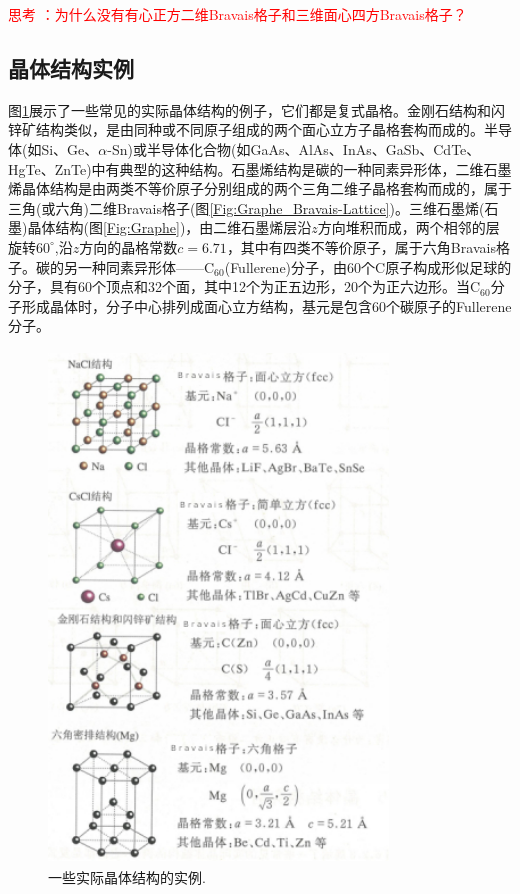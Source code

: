 \textcolor{red}{\heiti 思考 ：为什么没有有心正方二维Bravais格子和三维面心四方Bravais格子？}

\subsection{晶体结构实例}
图\ref{Fig:Crystal-structure-example}展示了一些常见的实际晶体结构的例子，它们都是复式晶格。金刚石结构和闪锌矿结构类似，是由同种或不同原子组成的两个面心立方子晶格套构而成的。半导体(如Si、Ge、$\alpha$-Sn)或半导体化合物(如GaAs、AlAs、InAs、GaSb、CdTe、HgTe、ZnTe)中有典型的这种结构。石墨烯结构是碳的一种同素异形体，二维石墨烯晶体结构是由两类不等价原子分别组成的两个三角二维子晶格套构而成的，属于三角(或六角)二维Bravais格子(图\ref{Fig:Graphe_Bravais-Lattice})。三维石墨烯(石墨)晶体结构(图\ref{Fig:Graphe})，由二维石墨烯层沿$z$方向堆积而成，两个相邻的层旋转$60^{\circ}$,沿$z$方向的晶格常数$c=6.71$，其中有四类不等价原子，属于六角Bravais格子。碳的另一种同素异形体——$\mathrm{C}_{60}$(Fullerene)分子，由60个C原子构成形似足球的分子，具有60个顶点和32个面，其中12个为正五边形，20个为正六边形。当$\mathrm{C}_{60}$分子形成晶体时，分子中心排列成面心立方结构，基元是包含60个碳原子的Fullerene分子。
\begin{figure}[h!]
\centering
\vspace*{-0.05in}
\includegraphics[height=5.35in,width=3.55in,viewport=0 0 70 110,clip]{Figures/Crystal_Structure-examples.jpg}
\caption{\small \textrm{一些实际晶体结构的实例.}}%
\label{Fig:Crystal-structure-example}
\end{figure}

